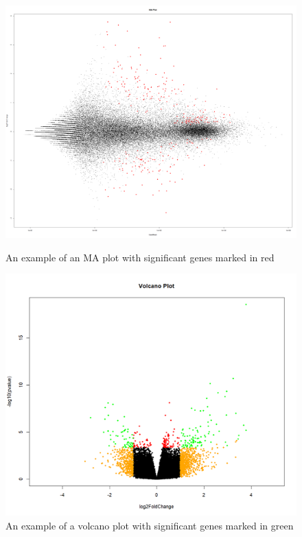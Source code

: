 \documentclass[11pt]{article}
\begin{document}
\begin{figure}
    \centering
    \begin{minipage}{0.45\textwidth}
        \centering
        \includegraphics[width=1\textwidth]{maplot.png} %
        \caption{An example of an MA plot with significant genes marked in red}
        \label{fig:maplot}
    \end{minipage}\hfill
    \begin{minipage}{0.45\textwidth}
        \centering
        \includegraphics[width=1\textwidth]{volcano.png} %
        \caption{An example of a volcano plot with significant genes marked in green}
        \label{fig:volcanoplot}
    \end{minipage}
\end{figure}
\end{document}
